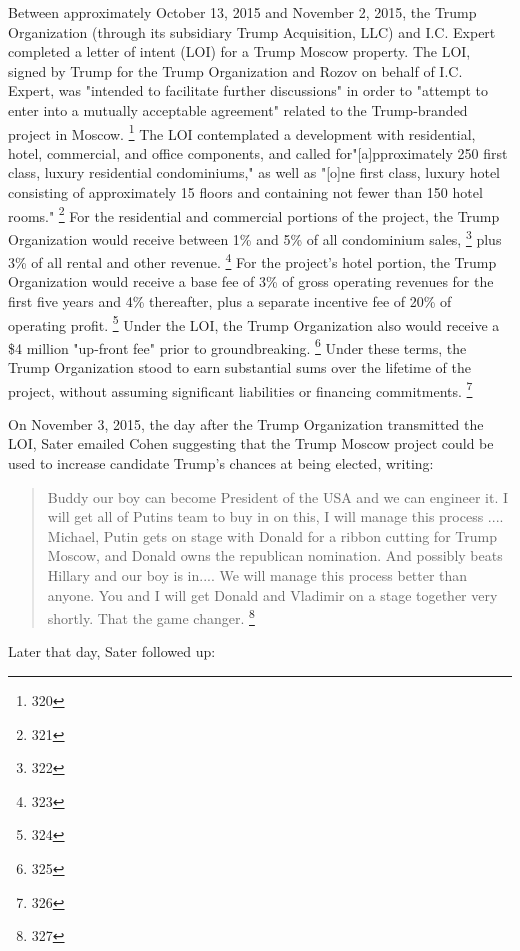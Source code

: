 Between approximately October 13, 2015 and November 2, 2015, the Trump Organization (through its subsidiary Trump Acquisition, LLC) and I.C. Expert completed a letter of intent (LOI) for a Trump Moscow property.
The LOI, signed by Trump for the Trump Organization and Rozov on behalf of I.C. Expert, was "intended to facilitate further discussions" in order to "attempt to enter into a mutually acceptable agreement" related to the Trump-branded project in Moscow.%
\footnote{320}
The LOI contemplated a development with residential, hotel, commercial, and office components, and called for"[a]pproximately 250 first class, luxury residential condominiums," as well as "[o]ne first class, luxury hotel consisting of approximately 15 floors and containing not fewer than 150 hotel rooms."%
\footnote{321}
For the residential and commercial portions of the project, the Trump Organization would receive between 1\% and 5\% of all condominium sales,%
\footnote{322}
plus 3\% of all rental and other revenue.%
\footnote{323}
For the project's hotel portion, the Trump Organization would receive a base fee of 3\% of gross operating revenues for the first five years and 4\% thereafter, plus a separate incentive fee of 20\% of operating profit.%
\footnote{324}
Under the LOI, the Trump Organization also would receive a \$4 million "up-front fee" prior to groundbreaking.%
\footnote{325}
Under these terms, the Trump Organization stood to earn substantial sums over the lifetime of the project, without assuming significant liabilities or financing commitments.%
\footnote{326}

On November 3, 2015, the day after the Trump Organization transmitted the LOI, Sater emailed Cohen suggesting that the Trump Moscow project could be used to increase candidate Trump's chances at being elected, writing:

\begin{quote}
Buddy our boy can become President of the USA and we can engineer it.
I will get all of Putins team to buy in on this, I will manage this process ....
Michael, Putin gets on stage with Donald for a ribbon cutting for Trump Moscow, and Donald owns the republican nomination.
And possibly beats Hillary and our boy is in....
We will manage this process better than anyone.
You and I will get Donald and Vladimir on a stage together very shortly.
That the game changer.%
\footnote{327}
\end{quote}

Later that day, Sater followed up:


